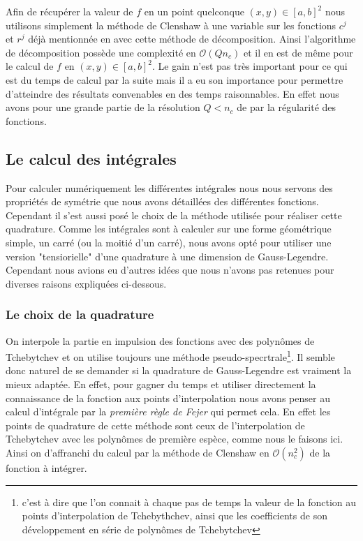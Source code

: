 \documentclass[10pt]{article}
\begin{document}
\begin{multicols}{2}
Afin de récupérer la valeur de $f$ en un point quelconque $(x,y) \in [a,b]^2 $ nous utilisons simplement la méthode de Clenshaw à une variable sur les fonctions $c^j$ et $r^j$ déjà mentionnée en  avec cette méthode de décomposition. Ainsi l'algorithme de décomposition possède une complexité en $\mathcal{O}(Q n_c)$ et il en est de même pour le calcul de $f$ en $(x,y) \in [a,b]^2$. Le gain n'est pas très important pour ce qui est du temps de calcul par la suite mais il a eu son importance pour permettre d'atteindre des résultats convenables en des temps raisonnables. En effet nous avons pour une grande partie de la résolution $Q < n_c$ de par la régularité des fonctions. \\



\subsection{Le calcul des intégrales} 

Pour calculer numériquement les différentes intégrales nous nous servons des propriétés de symétrie que nous avons détaillées des différentes fonctions. Cependant il s'est aussi posé le choix de la méthode utilisée pour réaliser cette quadrature. Comme les intégrales sont à calculer sur une forme géométrique simple, un carré (ou la moitié d'un carré), nous avons opté pour utiliser une version "tensiorielle" d'une quadrature à une dimension de Gauss-Legendre. Cependant nous avions eu d'autres idées que nous n'avons pas retenues pour diverses raisons expliquées ci-dessous.


\subsubsection{Le choix de la quadrature}

On interpole la partie en impulsion des fonctions avec des polynômes de Tchebytchev et on utilise toujours une méthode pseudo-specrtrale\footnote{c'est à dire que l'on connait à chaque pas de temps la valeur de la fonction au points d'interpolation de Tchebythchev, ainsi que les coefficients de son développement en série de polynômes de Tchebytchev}. Il semble donc naturel de se demander si la quadrature de Gauss-Legendre est vraiment la mieux adaptée. En effet, pour gagner du temps et utiliser directement la connaissance de la fonction aux points d'interpolation nous avons penser au calcul d'intégrale par la \emph{première règle de Fejer} \cite{} qui permet cela. En effet les points de quadrature de cette méthode sont ceux de l'interpolation de Tchebytchev avec les polynômes de première espèce, comme nous le faisons ici. Ainsi on d'affranchi du calcul par la méthode de Clenshaw en $\mathcal{O}(n_c^2)$ de la fonction à intégrer. 
 

\end{multicols}
\end{document}
